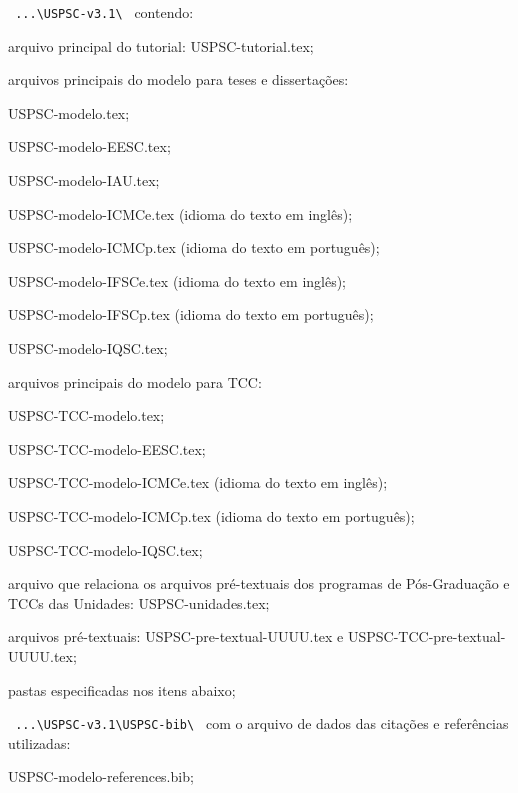 \begin{alineas}	
	\item \verb+ ...\USPSC-v3.1\ + contendo:	
		\begin{alineas}
			\item arquivo principal do tutorial: USPSC-tutorial.tex;
			\item arquivos principais do modelo para teses e dissertações:
				\begin{subalineas}
					\item USPSC-modelo.tex;
					\item USPSC-modelo-EESC.tex;
					\item USPSC-modelo-IAU.tex;
					\item USPSC-modelo-ICMCe.tex (idioma do texto em ingl\^es);
					\item USPSC-modelo-ICMCp.tex (idioma do texto em portugu\^es);
					\item USPSC-modelo-IFSCe.tex (idioma do texto em ingl\^es);
					\item USPSC-modelo-IFSCp.tex (idioma do texto em portugu\^es);
					\item USPSC-modelo-IQSC.tex;
				\end{subalineas}
			\item arquivos principais do modelo para TCC: 
			\begin{subalineas}
				\item USPSC-TCC-modelo.tex;
				\item USPSC-TCC-modelo-EESC.tex;
				\item USPSC-TCC-modelo-ICMCe.tex (idioma do texto em ingl\^es);
				\item USPSC-TCC-modelo-ICMCp.tex (idioma do texto em portugu\^es);
				\item USPSC-TCC-modelo-IQSC.tex;
			\end{subalineas}
			\item arquivo que relaciona os arquivos pr\'e-textuais dos programas de Pós-Graduação e TCCs das Unidades: USPSC-unidades.tex;
			\item arquivos pr\'e-textuais: USPSC-pre-textual-UUUU.tex e USPSC-TCC-pre-textual-UUUU.tex;
			\item pastas especificadas nos itens abaixo;
	   	\end{alineas}
	   	
	\item \verb+ ...\USPSC-v3.1\USPSC-bib\ + com o arquivo de dados das citações e refer\^encias utilizadas: 
		\begin{alineas}	
			\item USPSC-modelo-references.bib;
		\end{alineas} 
		

\end{alineas}
